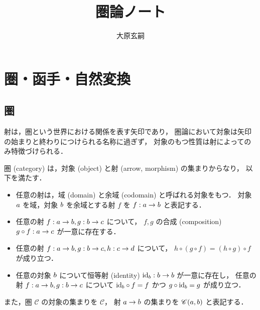 \documentclass[titlepage]{ltjsreport}
\title{圏論ノート}
\author{大原玄嗣}
\newcommand{\cat}[1]{\mathscr{#1}}
\newcommand{\obj}[1]{\lowercase{#1}}
\newcommand{\objs}[1]{#1}
\newcommand{\mrp}[3]{{#1}:{#2}\to{#3}}
\newcommand{\mrps}[3]{#1(#2,#3)}
\newcommand{\id}[1]{\mathrm{id}_{#1}}
\begin{document}
\maketitle
\tableofcontents

\chapter{圏・函手・自然変換}

\section{圏}

射は，圏という世界における関係を表す矢印であり，
圏論において対象は矢印の始まりと終わりにつけられる名称に過ぎず，
対象のもつ性質は射によってのみ特徴づけられる．

\begin{definition}[圏]
  \def\a{\obj{a}}%
  \def\b{\obj{b}}%
  \def\c{\obj{c}}%
  \def\d{\obj{d}}%
  圏 (category) は，対象 (object) と射 (arrow, morphism) の集まりからなり，
  以下を満たす．
  \begin{itemize}
    \item 任意の射は，域 (domain) と余域 (codomain) と呼ばれる対象をもつ．
          対象 $\a$ を域，対象 $\b$ を余域とする射 $f$ を
          $\mrp{f}{\a}{\b}$ と表記する．
    \item 任意の射 $\mrp{f}{\a}{\b},\mrp{g}{\b}{\c}$ について，
          $f,g$ の合成 (composition) $\mrp{g\circ f}{\a}{\c}$
          が一意に存在する．
    \item 任意の射 $\mrp{f}{\a}{\b},\mrp{g}{\b}{\c},\mrp{h}{\c}{\d}$ について，
          $h\circ(g\circ f)=(h\circ g)\circ f$ が成り立つ．
    \item 任意の対象 $\b$ について恒等射 (identity)
          $\mrp{\id{\b}}{\b}{\b}$ が一意に存在し，
          任意の射 $\mrp{f}{\a}{\b},\mrp{g}{\b}{\c}$ について
          $\id{\b}\circ f=f$ かつ $g\circ\id{\b}=g$ が成り立つ．
  \end{itemize}
  また，圏 $\cat{C}$ の対象の集まりを $\objs{\cat{C}}$，
  射 $\a\to\b$ の集まりを $\mrps{\cat{C}}{\a}{\b}$ と表記する．
  \begin{center}
  \end{center}
\end{definition}
\end{document}
